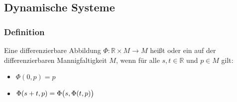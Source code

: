 \subsection{Dynamische Systeme} %
\label{sub:25}

\subsubsection[Definition: Dynamisches System]{Definition} %
\label{ssub:251}
Eine differenzierbare Abbildung $\Phi : \mathds{R} \times M  \to M$ heißt  oder ein  auf der differenzierbaren 
Mannigfaltigkeit $M$, wenn für alle $s,t \in \mathds{R}$ und $p \in M$ gilt:
\begin{itemize}
	\item $\Phi(0,p) = p$
	\item $\Phi(s+t, p) = \Phi\enbrace[\big]{s, \Phi (t,p)}$
\end{itemize}

